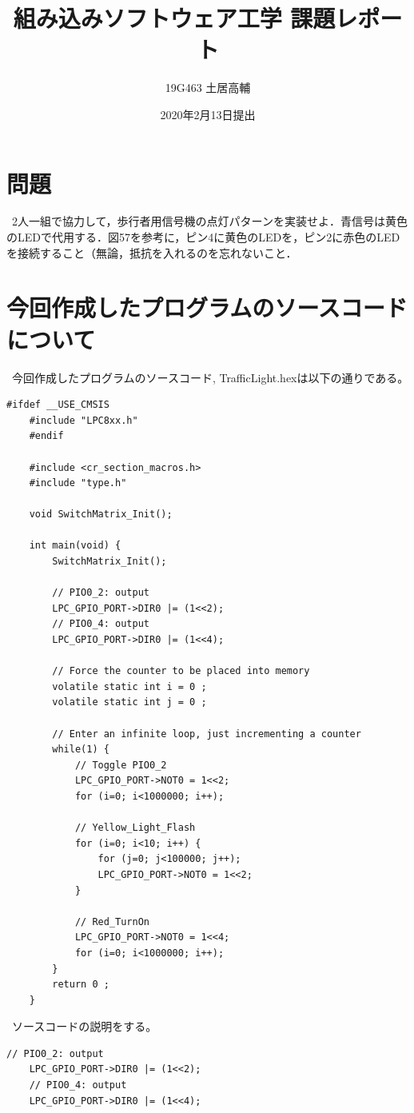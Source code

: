 \documentclass[titlepage]{ujarticle}
\title{組み込みソフトウェア工学 課題レポート}
\author{19G463 土居高輔}
\date{2020年2月13日提出}
\begin{document}
\maketitle
\section{問題}
	\ 2人一組で協力して，歩行者用信号機の点灯パターンを実装せよ．青信号は黄色のLEDで代用する．図57を参考に，ピン4に黄色のLEDを，ピン2に赤色のLEDを接続すること（無論，抵抗を入れるのを忘れないこと． \par
	\vspace{\baselineskip}
\section{今回作成したプログラムのソースコードについて}
	\ 今回作成したプログラムのソースコード, TrafficLight.hexは以下の通りである。 \par
	\begin{lstlisting}[caption = TrafficLight.pl, label = program1]
	#ifdef __USE_CMSIS
	#include "LPC8xx.h"
	#endif
	
	#include <cr_section_macros.h>
	#include "type.h"
	
	void SwitchMatrix_Init();
	
	int main(void) {
		SwitchMatrix_Init();
		
		// PIO0_2: output
		LPC_GPIO_PORT->DIR0 |= (1<<2);
		// PIO0_4: output
		LPC_GPIO_PORT->DIR0 |= (1<<4);
		
		// Force the counter to be placed into memory
		volatile static int i = 0 ;
		volatile static int j = 0 ;
		
		// Enter an infinite loop, just incrementing a counter
		while(1) {
			// Toggle PIO0_2
			LPC_GPIO_PORT->NOT0 = 1<<2;	
			for (i=0; i<1000000; i++);
			
			// Yellow_Light_Flash
			for (i=0; i<10; i++) {
				for (j=0; j<100000; j++);
				LPC_GPIO_PORT->NOT0 = 1<<2;
			}
		
			// Red_TurnOn
			LPC_GPIO_PORT->NOT0 = 1<<4;
			for (i=0; i<1000000; i++);
		}
		return 0 ;
	}
	\end{lstlisting}
	\vspace{\baselineskip}
	\ ソースコードの説明をする。 \par
	\begin{lstlisting}[caption = 13～16行目, label = program1]
	// PIO0_2: output
	LPC_GPIO_PORT->DIR0 |= (1<<2);
	// PIO0_4: output
	LPC_GPIO_PORT->DIR0 |= (1<<4);
	\end{lstlisting}
\end{document}
